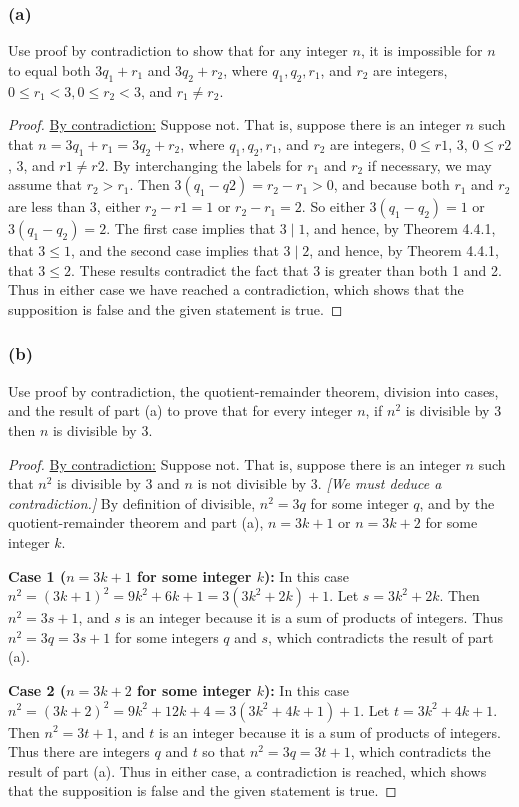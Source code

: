\documentclass[14pt]{extarticle}
\begin{document}
\subsubsection{(a)}
Use proof by contradiction to show that for any integer $n$, it is impossible for $n$ to equal both $3q_1 + r_1$ and $3q_2 + r_2$, where $q_1, q_2, r_1$, and $r_2$ are integers, $0 \leq r_1 < 3, 0 \leq r_2 < 3$, and $r_1 \neq r_2$.

\begin{proof}
\underline{By contradiction:} Suppose not. That is, suppose there is an integer $n$ such that $n = 3q_1 + r_1 = 3q_2 + r_2$, where $q_1, q_2, r_1$, and $r_2$ are integers, $0 \leq r1$, 3, $0 \leq r2$, 3, and $r1 \neq r2$. By interchanging the labels for $r_1$ and $r_2$ if necessary, we may assume that $r_2 > r_1$. Then $3(q_1 - q2) = r_2 - r_1 > 0$, and because both $r_1$ and $r_2$ are less than 3, either $r_2 - r1 = 1$ or $r_2 - r_1 = 2$. So either $3(q_1 - q_2) = 1$ or $3(q_1 - q_2) = 2$. The first case implies that $3 \mid 1$, and hence, by Theorem 4.4.1, that $3 \leq 1$, and the second case implies that $3 \mid 2$, and hence, by Theorem 4.4.1, that $3 \leq 2$. These results contradict the fact that 3 is greater than both 1 and 2. Thus in either case we have reached a contradiction, which shows that the supposition is false and the given statement is true.
\end{proof}

\subsubsection{(b)}
Use proof by contradiction, the quotient-remainder theorem, division into cases, and the result of part (a) to prove that for every integer $n$, if $n^2$ is divisible by 3 then $n$ is divisible by 3.

\begin{proof}
\underline{By contradiction:} Suppose not. That is, suppose there is an integer $n$ such that $n^2$ is divisible by 3 and $n$ is not divisible by 3. {\it [We must deduce a contradiction.]} By definition of divisible, $n^2 = 3q$ for some integer $q$, and by the quotient-remainder theorem and part (a), $n = 3k + 1$ or $n = 3k + 2$ for some integer $k$. 

{\bf Case 1 ($n = 3k + 1$ for some integer $k$):} In this case $n^2 = (3k + 1)^2 = 9k^2 + 6k + 1 = 3(3k^2 + 2k) + 1$. Let $s = 3k^2 + 2k$. Then $n^2 = 3s + 1$, and $s$ is an integer because it is a sum of products of integers. Thus $n^2 = 3q = 3s + 1$ for some integers $q$ and $s$, which contradicts the result of part (a).

{\bf Case 2 ($n = 3k + 2$ for some integer $k$):} In this case $n^2 = (3k + 2)^2 = 9k^2 + 12k + 4 = 3(3k^2 + 4k + 1) + 1$. Let $t = 3k^2 + 4k + 1$. Then $n^2 = 3t + 1$, and $t$ is an integer because it is a sum of products of integers. Thus there are integers $q$ and $t$ so that $n^2 = 3q = 3t + 1$, which contradicts the result of part (a). Thus in either case, a contradiction is reached, which shows that the supposition is false and the given statement is true.
\end{proof}
\end{document}
